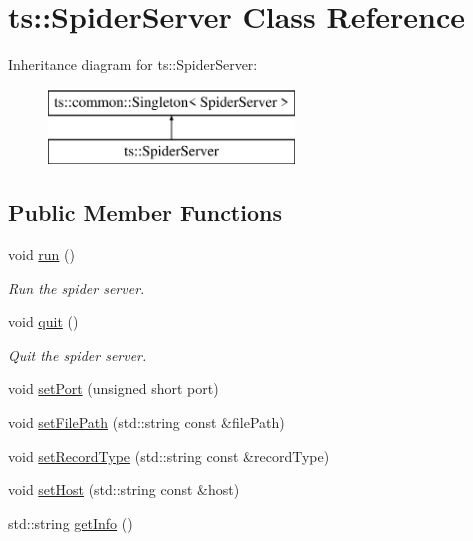 \hypertarget{classts_1_1_spider_server}{}\section{ts\+:\+:Spider\+Server Class Reference}
\label{classts_1_1_spider_server}
Inheritance diagram for ts\+:\+:Spider\+Server\+:\begin{figure}[H]
\begin{center}
\leavevmode
\includegraphics[height=2.000000cm]{classts_1_1_spider_server}
\end{center}
\end{figure}
\subsection*{Public Member Functions}
\begin{DoxyCompactItemize}
\item 
\mbox{\label{classts_1_1_spider_server_afbcf37b3da1c79cb5062d8ef914cbada}} 
void \hyperlink{classts_1_1_spider_server_afbcf37b3da1c79cb5062d8ef914cbada}{run} ()
\begin{DoxyCompactList}\small\item\em Run the spider server. \end{DoxyCompactList}\item 
\mbox{\label{classts_1_1_spider_server_a396c6f71fbca158e5710eaa4c13cf959}} 
void \hyperlink{classts_1_1_spider_server_a396c6f71fbca158e5710eaa4c13cf959}{quit} ()
\begin{DoxyCompactList}\small\item\em Quit the spider server. \end{DoxyCompactList}\item 
void \hyperlink{classts_1_1_spider_server_afe31d95fbbdf53ca31fd3e80fdef734d}{set\+Port} (unsigned short port)
\item 
void \hyperlink{classts_1_1_spider_server_a747cb40f25dd9c9d0f6819d27647904e}{set\+File\+Path} (std\+::string const \&file\+Path)
\item 
void \hyperlink{classts_1_1_spider_server_a41cb70d329d84fbb37199556ca5e1fea}{set\+Record\+Type} (std\+::string const \&record\+Type)
\item 
void \hyperlink{classts_1_1_spider_server_a241af3e9ae7a627184b37a4b657c4ef1}{set\+Host} (std\+::string const \&host)
\item 
std\+::string \hyperlink{classts_1_1_spider_server_ac5b16b49dfd465073e0cb235b1812b6e}{get\+Info} ()
\end{DoxyCompactItemize}
